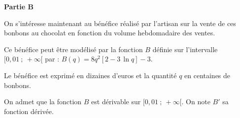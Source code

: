\smallskip

\begin{center}
\textbf{Partie B}
\end{center}

On s'intéresse maintenant au bénéfice réalisé par l'artisan sur la vente de ces bonbons au chocolat en fonction du volume hebdomadaire des ventes.


Ce bénéfice peut être modélisé par la fonction $B$ définie sur l'intervalle $[0,01~;~+\infty[$ par :  $B(q) = 8q^2 [2 -3\,\ln q] - 3.$

Le bénéfice est exprimé en dizaines d'euros et la quantité $q$ en centaines de bonbons.

On admet que la fonction $B$ est dérivable sur $[0,01~;~+\infty[$. On note $B'$ sa fonction dérivée. 

